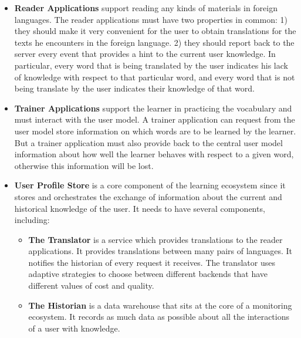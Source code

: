 \begin{itemize}
	
	\item {\bf Reader Applications} 
	support reading any kinds of materials in foreign languages. The reader applications must have two properties in common: 
		1) they should make it very convenient for the user to obtain translations for the texts he encounters in the foreign language. 
		2) they should report back to the server every event that provides a hint to the current user knowledge. In particular, every word that is being translated by the user indicates his lack of knowledge with respect to that particular word, and every word that is not being translate by the user indicates their knowledge of that word.
	
		\item {\bf Trainer Applications} support the learner in practicing the vocabulary and must interact with the user model. A trainer application can request from the user model store information on which words are to be learned by the learner. But a trainer application must also provide back to the central user model information about how well the learner behaves with respect to a given word, otherwise this information will be lost. 


		\item {\bf User Profile Store} 
		is a core component of the learning ecosystem since it stores and orchestrates the exchange of information about the current and historical knowledge of the user. It needs to have several components, including: 

		\newcommand {\archiblock}[1]{\item {\bf #1}}

		\begin{itemize}

			\archiblock{The Translator} is a service which provides translations to the reader applications. It provides translations between many pairs of languages. It notifies the historian of every request it receives. 
			The translator uses adaptive strategies to choose between different backends that have different values of cost and quality.

			\archiblock{The Historian} is a data warehouse that sits at the core of a monitoring ecosystem. It records as much data as possible about all the interactions of a user with knowledge. 


\end{itemize}
\end{itemize}
